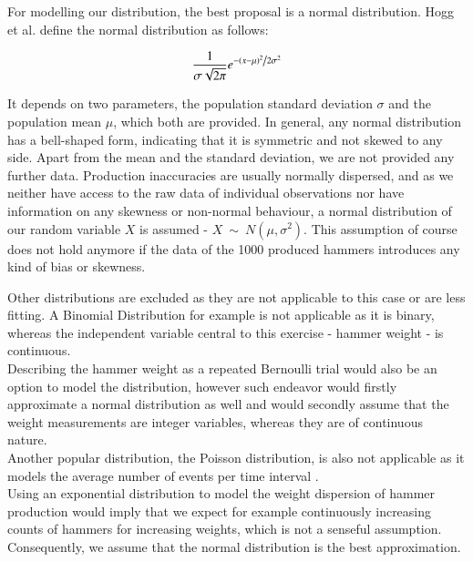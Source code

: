 For modelling our distribution, the best proposal is a normal distribution. Hogg et al. \cite[Definition~3.4.1]{hogg} define the normal distribution as follows: 

\begin{equation} \frac{1}{{\sigma \sqrt {2\pi } }}e^{{{ - \left( {x - \mu } \right)^2 } \mathord{\left/ {\vphantom {{ - \left( {x - \mu } \right)^2 } {2\sigma ^2 }}} \right. \kern-\nulldelimiterspace}{2\sigma ^2 }}}
\label{eq:normaldist}
\end{equation}


It depends on two parameters, the population standard deviation $\sigma$ and the population mean $\mu$, which both are provided. In general, any normal distribution has a bell-shaped form, indicating that it is symmetric and not skewed to any side. Apart from the mean and the standard deviation, we are not provided any further data. Production inaccuracies are usually normally dispersed, and as we neither have access to the raw data of individual observations nor have information on any skewness or non-normal behaviour, a normal distribution of our random variable $X$ is assumed - $ X~\sim~N(\mu, \sigma^2)$. This assumption of course does not hold anymore if the data of the 1000 produced hammers introduces any kind of bias or skewness. 


Other distributions are excluded as they are not applicable to this case or are less fitting. A Binomial Distribution for example is not applicable as it is binary, whereas the independent variable central to this exercise - hammer weight - is continuous. \\Describing the hammer weight as a repeated Bernoulli trial would also be an option to model the distribution, however such endeavor would firstly approximate a normal distribution as well and would secondly assume that the weight measurements are integer variables, whereas they are of continuous nature. \\
Another popular distribution, the Poisson distribution, is also not applicable as it models the average number of events per time interval \cite{bruce2017practical}. \\
Using an exponential distribution to model the weight dispersion of hammer production would imply that we expect for example continuously increasing counts of hammers for increasing weights, which is not a senseful assumption. \\
Consequently, we assume that the normal distribution is the best approximation.

